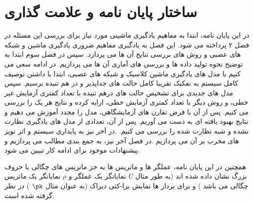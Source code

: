 \section{ساختار پایان نامه و علامت گذاری}





در این پایان نامه، ابتدا به مفاهیم یادگیری ماشینی مورد نیاز برای بررسی این مسئله در فصل ۲ پرداخته می شود. این فصل به یادگیری  مفاهیم ضروری یادگیری ماشین و شبکه های عصبی و روش های بررسی نتایج آن ها می پردازد.
سپس در فصل سوم ابتدا به توضیح نحوه تولید داده ها و بررسی های آماری آن ها می پردازیم. در ادامه سعی می کنیم با مدل های یادگیری ماشین کلاسیک و شبکه های عصبی، ابتدا با داشتن توصیف کامل سیستم به تفکیک تقریبا کامل حالت های جداپذیر و در هم تنیده برسیم. سپس مدل های جدیدی برای تشخیص حالت های درهم تنیده با تعداد کمتری آزمایش غیر خطی، و روش دیگر با تعداد کمتری آزمایش خطی، ارایه کرده و نتایج هر یک را بررسی می کنیم. پس از آن با فرض تقارن های آزمایشگاهی، مدل را مجدد آموزش می دهیم و نتایج بهبود یافته ای به دست می آوریم.
پس از آن، تعدادی از مدل های یادگیری نظارت نشده و شبه نظارت شده را بررسی می کنیم.
.در آخر نیز به پایداری سیستم و اثر نویز های مخرب بر آن می پردازیم
.در فصل آخر نیز، به جمع بندی مطالب می پردازیم و پیشنهادات موجود برای ادامه کار تبیین می شود.

همچنین در این پایان نامه، عملگر ها و ماتریس ها به جز ماتریس های چگالی با حروف بزرگ نشان داده شده اند  (به طور مثال
$U$
نمایانگر یک عملگر و
$\rho$
نمایانگر یک ماتریس چگالی می باشد
) و
برای بردار ها نمایش برا-کتی دیراک (به عنوان مثال
$\pk$
) در نظر گرفته شده است.
